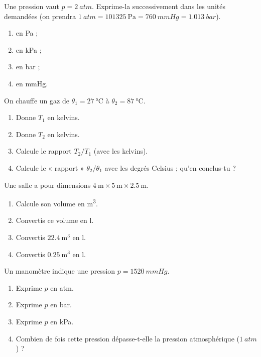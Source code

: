 \documentclass[11pt,a4paper]{article}
\begin{document}
\begin{exo}
Une pression vaut $p=\qty{2}{atm}$. Exprime-la successivement dans les unités demandées (on prendra
$\qty{1}{atm}=\qty{101325}{\pascal}=\qty{760}{mmHg}=\qty{1.013}{bar}$).
\begin{enumerate}[label=\alph*)]
  \item en \si{\pascal} ;
  \item en \si{\kilo\pascal} ;
  \item en \si{bar} ;
  \item en \si{mmHg}.
\end{enumerate}
\end{exo}

\begin{exo}
On chauffe un gaz de $\theta_1=\qty{27}{\degreeCelsius}$ à $\theta_2=\qty{87}{\degreeCelsius}$.
\begin{enumerate}[label=\alph*)]
  \item Donne $T_1$ en kelvins.
  \item Donne $T_2$ en kelvins.
  \item Calcule le rapport $T_2/T_1$ (avec les kelvins).
  \item Calcule le « rapport » $\theta_2/\theta_1$ avec les degrés Celsius ; qu'en conclus-tu ?
\end{enumerate}
\end{exo}

\begin{exo}
Une salle a pour dimensions $\qty{4}{\meter}\times\qty{5}{\meter}\times\qty{2.5}{\meter}$.
\begin{enumerate}[label=\alph*)]
  \item Calcule son volume en \si{\meter\cubed}.
  \item Convertis ce volume en \si{\litre}.
  \item Convertis $\qty{22.4}{\meter\cubed}$ en \si{\litre}.
  \item Convertis $\qty{0.25}{\meter\cubed}$ en \si{\litre}.
\end{enumerate}
\end{exo}

\begin{exo}
Un manomètre indique une pression $p=\qty{1520}{mmHg}$.
\begin{enumerate}[label=\alph*)]
  \item Exprime $p$ en \si{atm}.
  \item Exprime $p$ en \si{bar}.
  \item Exprime $p$ en \si{\kilo\pascal}.
  \item Combien de fois cette pression dépasse-t-elle la pression atmosphérique ($\qty{1}{atm}$) ?
\end{enumerate}
\end{exo}
\end{document}
